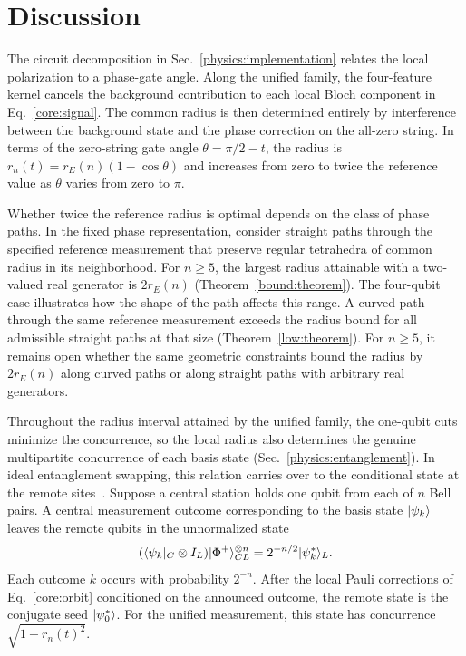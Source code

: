 \section{Discussion}
\label{discussion:section}

The circuit decomposition in Sec.~\ref{physics:implementation} relates the local polarization to a phase-gate angle. Along the unified family, the four-feature kernel cancels the background contribution to each local Bloch component in Eq.~\eqref{core:signal}. The common radius is then determined entirely by interference between the background state and the phase correction on the all-zero string. In terms of the zero-string gate angle $\theta=\pi/2-t$, the radius is $r_n(t)=r_E(n)(1-\cos\theta)$ and increases from zero to twice the reference value as $\theta$ varies from zero to $\pi$.

Whether twice the reference radius is optimal depends on the class of phase paths. In the fixed phase representation, consider straight paths through the specified reference measurement that preserve regular tetrahedra of common radius in its neighborhood. For $n\ge5$, the largest radius attainable with a two-valued real generator is $2r_E(n)$ (Theorem~\ref{bound:theorem}). The four-qubit case illustrates how the shape of the path affects this range. A curved path through the same reference measurement exceeds the radius bound for all admissible straight paths at that size (Theorem~\ref{low:theorem}). For $n\ge5$, it remains open whether the same geometric constraints bound the radius by $2r_E(n)$ along curved paths or along straight paths with arbitrary real generators.

Throughout the radius interval attained by the unified family, the one-qubit cuts minimize the concurrence, so the local radius also determines the genuine multipartite concurrence of each basis state (Sec.~\ref{physics:entanglement}). In ideal entanglement swapping, this relation carries over to the conditional state at the remote sites~\cite{Zukowski1993,Huang2022}. Suppose a central station holds one qubit from each of $n$ Bell pairs. A central measurement outcome corresponding to the basis state $\lvert \psi_k\rangle$ leaves the remote qubits in the unnormalized state
\begin{equation}
 (\langle \psi_k\rvert_C\otimes I_L)\lvert \Phi^+\rangle_{CL}^{\otimes n}
 =2^{-n/2}\lvert \psi_k^*\rangle_L.
 \label{discussion:swapping}
\end{equation}
Each outcome $k$ occurs with probability $2^{-n}$. After the local Pauli corrections of Eq.~\eqref{core:orbit} conditioned on the announced outcome, the remote state is the conjugate seed $\lvert \psi_0^*\rangle$. For the unified measurement, this state has concurrence $\sqrt{1-r_n(t)^2}$.

